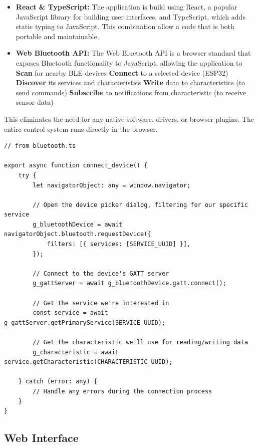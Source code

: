 \begin{itemize}
    \item \textbf{React \& TypeScript:} The application is build using React, a popular
          JavaScript library for building user interfaces, and TypeScript, which adds static
          typing to JavaScript. This combination allow a code that is both portable and
          maintainable.
    \item \textbf{Web Bluetooth API:} The Web Bluetooth API is a browser standard that
          exposes Bluetooth functionality to JavaScript, allowing the application to
          \subitem \textbf{Scan} for nearby BLE devices
          \subitem \textbf{Connect} to a selected device (ESP32)
          \subitem \textbf{Discover} its services and characteristics
          \subitem \textbf{Write} data to characteristics (to send commands)
          \subitem \textbf{Subscribe} to notifications from characteristic (to receive sensor data)
\end{itemize}

This eliminates the need for any native software, drivers, or browser plugins. The entire control
system runs directly in the browser.


\begin{lstlisting}[caption={Bluetooth connect\_device}]
// from bluetooth.ts

export async function connect_device() {
    try {
        let navigatorObject: any = window.navigator;

        // Open the device picker dialog, filtering for our specific service
        g_bluetoothDevice = await navigatorObject.bluetooth.requestDevice({
            filters: [{ services: [SERVICE_UUID] }],
        });

        // Connect to the device's GATT server
        g_gattServer = await g_bluetoothDevice.gatt.connect();

        // Get the service we're interested in
        const service = await g_gattServer.getPrimaryService(SERVICE_UUID);

        // Get the characteristic we'll use for reading/writing data
        g_characteristic = await service.getCharacteristic(CHARACTERISTIC_UUID);

    } catch (error: any) {
        // Handle any errors during the connection process
    }
}
\end{lstlisting}

\subsection{Web Interface}

